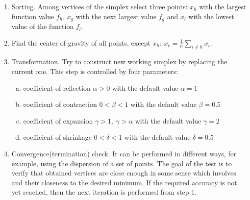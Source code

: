 \documentclass[%
master,         %
subf,           %
href,           %
colorlinks=true %
]{disser}
\numberwithin{equation}{section}
\numberwithin{figure}{section}
\begin{document}
\begin{enumerate}
\item Sorting. Among vertices of the simplex select three points: $x_h$ with the largest function value $f_h$, $x_g$ with the next largest value $f_g$ and $x_l$ with the lowest value of the function $f_l$. 
\item Find the center of gravity of all points, except $x_h$: $x_c=\frac{1}{n} \sum_{i\neq h} x_i$.
\item Transformation. Try to construct new working simplex by replacing the current one. This step is controlled by four parameters: 
\begin{enumerate}[a)]
	\item coefficient of reflection $\alpha > 0$ with the default value $\alpha = 1$
	\item coefficient of contraction $0 < \beta < 1$ with the default value $\beta = 0.5$
	\item coefficient of expansion $\gamma > 1,\ \gamma > \alpha$ with the default value $\gamma = 2$
\item coefficient of shrinkage $0 < \delta < 1$ with the default value $\delta = 0.5$
\end{enumerate}
\item Convergence(termination) check. It can be performed in different ways, for example, using the dispersion of a set of points. The goal of the test is to verify that obtained vertices are close enough in some sense which involves and their closeness to the desired minimum. If the required accuracy is not yet reached, then the next iteration is performed from step 1.
\end{enumerate}
\end{document}
